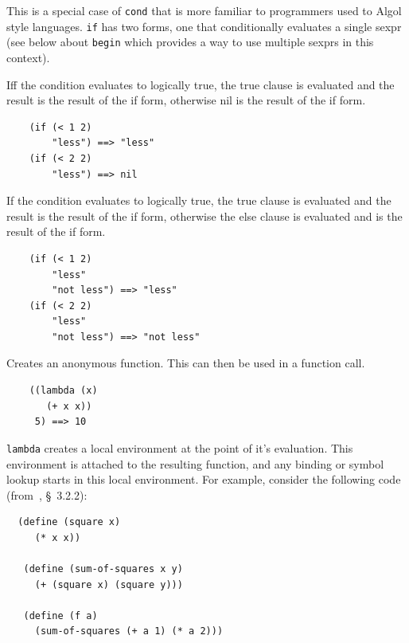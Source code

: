\documentclass[12pt]{article}
\begin{document}

This is a special case of \verb|cond| that is more familiar to
programmers used to Algol style languages. \verb|if| has two forms,
one that conditionally evaluates a single sexpr (see below about
\verb|begin| which provides a way to use multiple sexprs in this context).

Iff the condition evaluates to logically true, the true clause is
evaluated and the result is the result of the if form, otherwise nil
is the result of the if form. 

\begin{verbatim}
    (if (< 1 2) 
        "less") ==> "less"
    (if (< 2 2) 
        "less") ==> nil
\end{verbatim}


If the condition evaluates to logically true, the true clause is
evaluated and the result is the result of the if form, otherwise the
else clause is evaluated and is the result of the if form. 

\begin{verbatim}
    (if (< 1 2) 
        "less" 
        "not less") ==> "less"
    (if (< 2 2) 
        "less" 
        "not less") ==> "not less"
\end{verbatim}


Creates an anonymous function. This can then be used in a function call.

\begin{verbatim}
    ((lambda (x) 
       (+ x x)) 
     5) ==> 10
\end{verbatim}

\verb|lambda| creates a local environment at the point of it's
evaluation. This environment is attached to the resulting function,
and any binding or symbol lookup starts in this local environment. For
example, consider the following code (from~\cite{sicp}, \S~3.2.2):

\begin{verbatim}
  (define (square x)
     (* x x))

   (define (sum-of-squares x y)
     (+ (square x) (square y)))

   (define (f a)
     (sum-of-squares (+ a 1) (* a 2)))
\end{verbatim}
\end{document}
